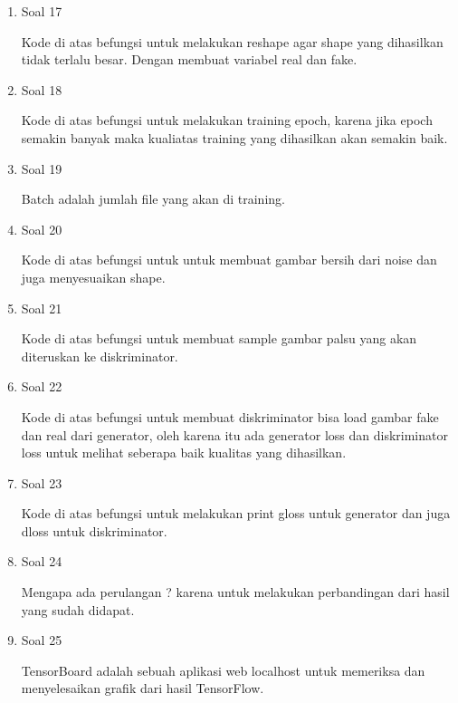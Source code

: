 \begin{enumerate}
	\item Soal 17
	\hfill\break
	
	Kode di atas befungsi untuk melakukan reshape agar shape yang dihasilkan tidak terlalu besar. Dengan membuat variabel real dan fake.

	\item Soal 18
	\hfill\break
	
	Kode di atas befungsi untuk melakukan training epoch, karena jika epoch semakin banyak maka kualiatas training yang dihasilkan akan semakin baik.

	\item Soal 19
	\hfill\break
	
	Batch adalah jumlah file yang akan di training.

	\item Soal 20
	\hfill\break
	
	Kode di atas befungsi untuk untuk membuat gambar bersih dari noise dan juga menyesuaikan shape.

	\item Soal 21
	\hfill\break
	
	Kode di atas befungsi untuk membuat sample gambar palsu yang akan diteruskan ke diskriminator.

	\item Soal 22
	\hfill\break
	
	Kode di atas befungsi untuk membuat diskriminator bisa load gambar fake dan real dari generator, oleh karena itu ada generator loss dan diskriminator loss untuk melihat seberapa baik kualitas yang dihasilkan.

	\item Soal 23
	\hfill\break
	
	Kode di atas befungsi untuk melakukan print gloss untuk generator dan juga dloss untuk diskriminator.

	\item Soal 24
	\hfill\break
	
	Mengapa ada perulangan ? karena untuk melakukan perbandingan dari hasil yang sudah didapat.

	\item Soal 25
	\hfill\break
	
	TensorBoard adalah sebuah aplikasi web localhost untuk memeriksa dan menyelesaikan grafik dari hasil TensorFlow.


\end{enumerate}
